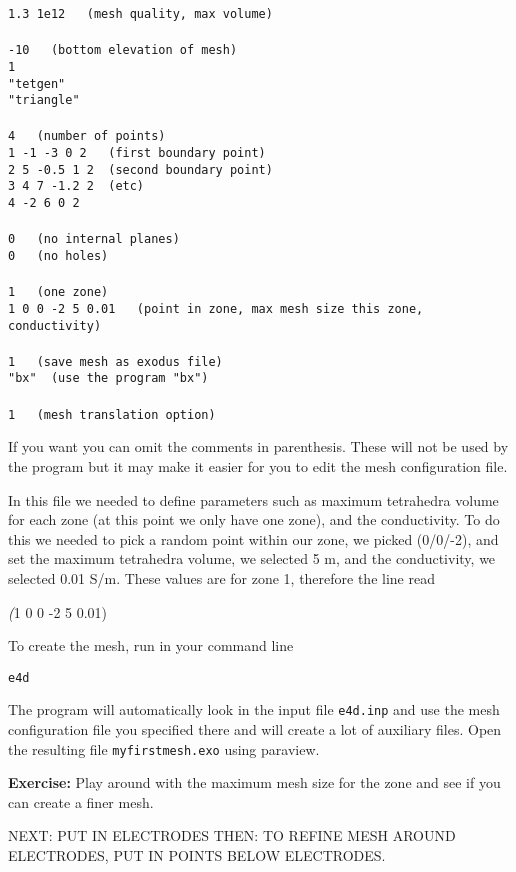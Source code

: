 \documentclass[11pt]{article}
\begin{document}
\verb+1.3 1e12   (mesh quality, max volume)+\\
\verb++\\
\verb+-10   (bottom elevation of mesh)+\\
\verb+1+\\
\verb+"tetgen"+\\
\verb+"triangle"+\\
\verb++\\
\verb+4   (number of points)+\\
\verb+1 -1 -3 0 2   (first boundary point)+\\
\verb+2 5 -0.5 1 2  (second boundary point)+\\
\verb+3 4 7 -1.2 2  (etc)+\\
\verb+4 -2 6 0 2+\\
\verb++\\
\verb+0   (no internal planes)+
\verb++\\
\verb+0   (no holes)+\\
\verb++\\
\verb+1   (one zone)+\\
\verb+1 0 0 -2 5 0.01   (point in zone, max mesh size this zone, conductivity)+\\
\verb++\\
\verb+1   (save mesh as exodus file)+\\
\verb+"bx"  (use the program "bx")+\\
\verb++\\
\verb+1   (mesh translation option)+


\vspace{2cm}

If you want you can omit the comments in parenthesis. These will not
be used by the program but it may make it easier for you to edit the
mesh configuration file.

In this file we needed to define parameters such as maximum tetrahedra
volume for each zone (at this point we only have one zone), and the
conductivity. To do this we needed to pick a random point within our
zone, we picked (0/0/-2), and set the maximum tetrahedra volume, we
selected 5 m, and the conductivity, we selected 0.01 S/m. These values
are for zone 1, therefore the line read

\emph(1 0 0 -2 5 0.01)

To create the mesh, run in your command line

\qquad \verb+e4d+

The program will automatically look in the input file \verb#e4d.inp#
and use the mesh configuration file you specified there and will
create a lot of auxiliary files. Open the resulting file
\verb#myfirstmesh.exo# using paraview.


\textbf{Exercise:}
Play around with the maximum mesh size for the zone and see if you can
create a finer mesh.



NEXT: PUT IN ELECTRODES
THEN: TO REFINE MESH AROUND ELECTRODES, PUT IN POINTS BELOW ELECTRODES.
\end{document}
